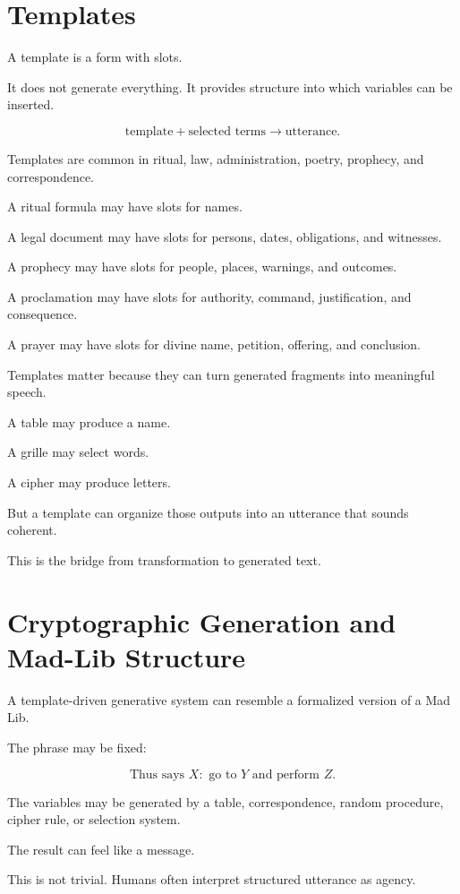 \documentclass[11pt]{book}
\begin{document}
\section{Templates}

A template is a form with slots.

It does not generate everything. It provides structure into which variables can be inserted.

\[
\text{template} + \text{selected terms} \rightarrow \text{utterance}.
\]

Templates are common in ritual, law, administration, poetry, prophecy, and correspondence.

A ritual formula may have slots for names.

A legal document may have slots for persons, dates, obligations, and witnesses.

A prophecy may have slots for people, places, warnings, and outcomes.

A proclamation may have slots for authority, command, justification, and consequence.

A prayer may have slots for divine name, petition, offering, and conclusion.

Templates matter because they can turn generated fragments into meaningful speech.

A table may produce a name.

A grille may select words.

A cipher may produce letters.

But a template can organize those outputs into an utterance that sounds coherent.

This is the bridge from transformation to generated text.

\section{Cryptographic Generation and Mad-Lib Structure}

A template-driven generative system can resemble a formalized version of a Mad Lib.

The phrase may be fixed:

\[
\text{Thus says } X: \text{ go to } Y \text{ and perform } Z.
\]

The variables may be generated by a table, correspondence, random procedure, cipher rule, or selection system.

The result can feel like a message.

This is not trivial. Humans often interpret structured utterance as agency.
\end{document}
